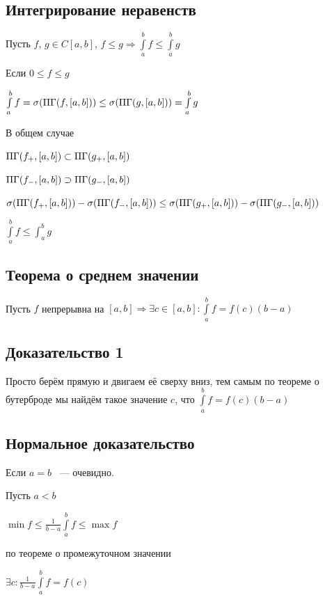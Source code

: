 \documentclass{article}
\begin{document}
		\subsection{Интегрирование неравенств}
		
			Пусть $f$, $g \in C[a, b]$, $f \leq g \Rightarrow \int\limits^b_a f \leq \int\limits^b_a g$
			
			Если $0 \leq f \leq g$
			
			$\int\limits^b_a f = \sigma (\Pi\Gamma (f, [a, b])) \leq \sigma (\Pi\Gamma (g, [a, b])) = \int\limits^b_a g$
			
			В общем случае
			
			$\Pi\Gamma(f_+, [a, b]) \subset \Pi\Gamma(g_+, [a, b])$
			
			$\Pi\Gamma(f_-, [a, b]) \supset \Pi\Gamma(g_-, [a, b])$
			
			$\sigma (\Pi\Gamma(f_+, [a, b])) - \sigma (\Pi\Gamma(f_-, [a, b])) \leq \sigma (\Pi\Gamma(g_+, [a, b])) - \sigma (\Pi\Gamma(g_-, [a, b]))$
			
			$\int\limits^b_a f \leq \int^b_a g$
			
		\subsection{Теорема о среднем значении}
		
			Пусть $f$ непрерывна на $[a, b] \Rightarrow \exists c \in [a, b]: \int\limits^b_a f = f(c)(b-a)$
		
		\subsection{Доказательство 1}
		
			Просто берём прямую и двигаем её сверху вниз, тем самым по теореме о бутерброде мы найдём такое значение $c$, что $\int\limits^b_a f = f(c)(b - a)$
			
		\subsection{Нормальное доказательство}
		
			Если $a = b$ ~--- очевидно.
			
			Пусть $a < b$
			
			$\min f \leq \frac{1}{b - a} \int\limits^b_a f \leq \max f$
			
			по теореме о промежуточном значении
			
			$\exists c : \frac{1}{b - a} \int\limits^b_a f = f(c)$
			
	\newpage
	
\end{document}
